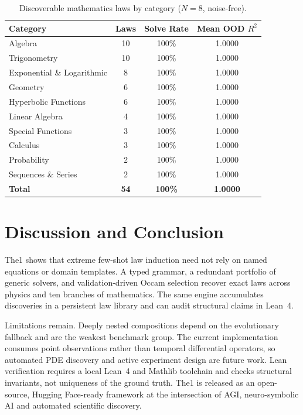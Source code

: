 \documentclass[10pt,journal,compsoc]{IEEEtran}
\begin{document}
\begin{table}[t]
\centering
\caption{Discoverable mathematics laws by category ($N=8$, noise-free).}
\label{tab:math}
\begin{tabular}{lccc}
\toprule
\textbf{Category} & \textbf{Laws} & \textbf{Solve Rate} & \textbf{Mean OOD $R^2$} \\
\midrule
Algebra & 10 & 100\% & 1.0000 \\
Trigonometry & 10 & 100\% & 1.0000 \\
Exponential \& Logarithmic & 8 & 100\% & 1.0000 \\
Geometry & 6 & 100\% & 1.0000 \\
Hyperbolic Functions & 6 & 100\% & 1.0000 \\
Linear Algebra & 4 & 100\% & 1.0000 \\
Special Functions & 3 & 100\% & 1.0000 \\
Calculus & 3 & 100\% & 1.0000 \\
Probability & 2 & 100\% & 1.0000 \\
Sequences \& Series & 2 & 100\% & 1.0000 \\
\midrule
\textbf{Total} & \textbf{54} & \textbf{100\%} & \textbf{1.0000} \\
\bottomrule
\end{tabular}
\end{table}

\section{Discussion and Conclusion}
The1 shows that extreme few-shot law induction need not rely on named equations or domain templates. A typed grammar, a redundant portfolio of generic solvers, and validation-driven Occam selection recover exact laws across physics and ten branches of mathematics. The same engine accumulates discoveries in a persistent law library and can audit structural claims in Lean~4.

Limitations remain. Deeply nested compositions depend on the evolutionary fallback and are the weakest benchmark group. The current implementation consumes point observations rather than temporal differential operators, so automated PDE discovery and active experiment design are future work. Lean verification requires a local Lean~4 and Mathlib toolchain and checks structural invariants, not uniqueness of the ground truth. The1 is released as an open-source, Hugging Face-ready framework at the intersection of AGI, neuro-symbolic AI and automated scientific discovery.
\end{document}
